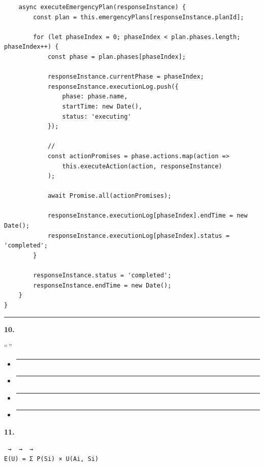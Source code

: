 \begin{verbatim}
    async executeEmergencyPlan(responseInstance) {
        const plan = this.emergencyPlans[responseInstance.planId];
        
        for (let phaseIndex = 0; phaseIndex < plan.phases.length; phaseIndex++) {
            const phase = plan.phases[phaseIndex];
            
            responseInstance.currentPhase = phaseIndex;
            responseInstance.executionLog.push({
                phase: phase.name,
                startTime: new Date(),
                status: 'executing'
            });
            
            // 
            const actionPromises = phase.actions.map(action => 
                this.executeAction(action, responseInstance)
            );
            
            await Promise.all(actionPromises);
            
            responseInstance.executionLog[phaseIndex].endTime = new Date();
            responseInstance.executionLog[phaseIndex].status = 'completed';
        }
        
        responseInstance.status = 'completed';
        responseInstance.endTime = new Date();
    }
}
\end{verbatim}

\begin{center}\rule{0.5\linewidth}{0.5pt}\end{center}

\textbf{10. }

``\,''

\begin{itemize}
\item
  \begin{center}\rule{0.5\linewidth}{0.5pt}\end{center}
\item
  \begin{center}\rule{0.5\linewidth}{0.5pt}\end{center}
\item
  \begin{center}\rule{0.5\linewidth}{0.5pt}\end{center}
\item
  \begin{center}\rule{0.5\linewidth}{0.5pt}\end{center}
\end{itemize}

\textbf{11. }

\begin{verbatim}
 →  →  → 
E(U) = Σ P(Si) × U(Ai, Si)
\end{verbatim}

